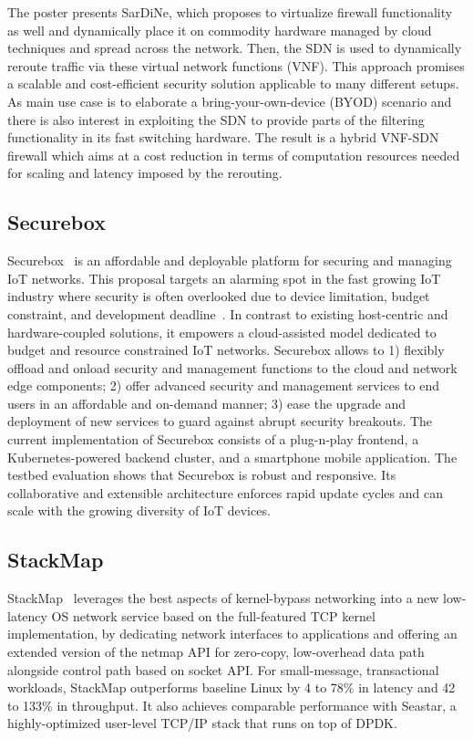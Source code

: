 The poster presents SarDiNe, which proposes to virtualize firewall
functionality as well and dynamically place it on commodity hardware managed
by cloud techniques and spread across the network. Then, the SDN is used to
dynamically reroute traffic via these virtual network functions (VNF). This
approach promises a scalable and cost-efficient security solution applicable to
many different setups. As main use case is to elaborate a
bring-your-own-device (BYOD) scenario and there is also interest in exploiting
the \ac{SDN} to provide parts of the filtering functionality in its fast
switching hardware. The result is a hybrid VNF-SDN firewall which aims at a
cost reduction in terms of computation resources needed for scaling and
latency imposed by the rerouting.

\subsection{Securebox}

Securebox~\cite{hafeez:can:2016, hafeez:s3:2015} is an affordable and
deployable platform for securing and managing IoT networks. This proposal
targets an alarming spot in the fast growing IoT industry where security is
often overlooked due to device limitation, budget constraint, and development
deadline~\cite{haus:comst:2017}.  In contrast to existing host-centric and
hardware-coupled solutions, it empowers a cloud-assisted model dedicated to
budget and resource constrained IoT networks. Securebox allows to 1) flexibly
offload and onload security and management functions to the cloud and network
edge components; 2) offer advanced security and management services to end
users in an affordable and on-demand manner; 3) ease the upgrade and
deployment of new services to guard against abrupt security breakouts. The
current implementation of Securebox consists of a plug-n-play frontend, a
Kubernetes-powered backend cluster, and a smartphone mobile application. The
testbed evaluation shows that Securebox is robust and responsive. Its
collaborative and extensible architecture enforces rapid update cycles and can
scale with the growing diversity of IoT devices.

\subsection{StackMap}

StackMap~\cite{kyasukata:atc:2016} leverages the best aspects of kernel-bypass
networking into a new low-latency OS network service based on the
full-featured TCP kernel implementation, by dedicating network interfaces to
applications and offering an extended version of the netmap API for zero-copy,
low-overhead data path alongside control path based on socket API\@. For
small-message, transactional workloads, StackMap outperforms baseline Linux by
4 to 78\% in latency and 42 to 133\% in throughput.  It also achieves
comparable performance with Seastar, a highly-optimized user-level TCP/IP
stack that runs on top of DPDK\@.

